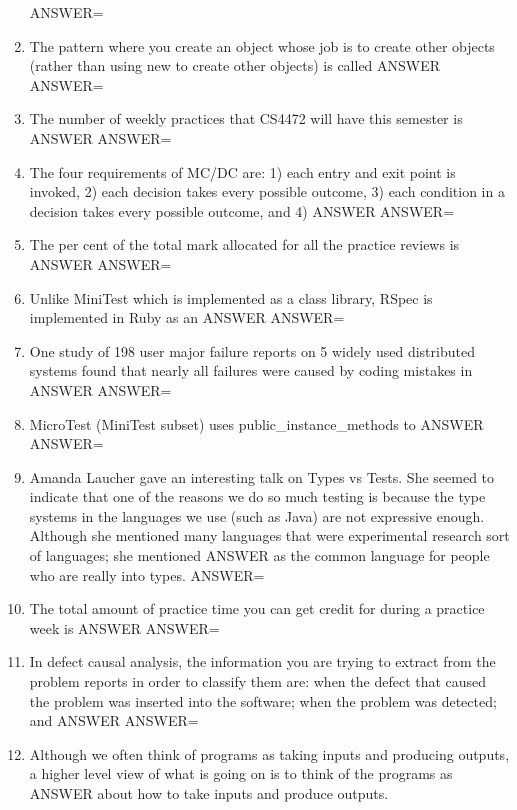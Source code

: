 \documentclass{exam}
\begin{document}
\begin{enumerate}
ANSWER=
\item The pattern where you create an object whose job is to create other objects (rather than using new to create other objects) is called ANSWER\newline
ANSWER=
\item The number of weekly practices that CS4472 will have this semester is ANSWER\newline
ANSWER=
\item The four requirements of MC/DC are: 1) each entry and exit point is invoked, 2) each decision takes every possible outcome, 3) each condition in a decision takes every possible outcome, and 4) ANSWER\newline
ANSWER=
\item The per cent of the total mark allocated for all the practice reviews is ANSWER\newline
ANSWER=
\item Unlike MiniTest which is implemented as a class library, RSpec is implemented in Ruby as an ANSWER\newline
ANSWER=
\item One study of 198 user major failure reports on 5 widely used distributed systems found that nearly all failures were caused by coding mistakes in ANSWER\newline
ANSWER=
\item MicroTest (MiniTest subset) uses public\_instance\_methods to ANSWER\newline
ANSWER=
\item Amanda Laucher gave an interesting talk on Types vs Tests.  She seemed to indicate that one of the reasons we do so much testing is because the type systems in the languages we use (such as Java) are not expressive enough.  Although she mentioned many languages that were experimental research sort of languages; she mentioned ANSWER as the common language for people who are really into types.\newline
ANSWER=
\item The total amount of practice time you can get credit for during a practice week is ANSWER\newline
ANSWER=
\item In defect causal analysis, the information you are trying to extract from the problem reports in order to classify them are: when the defect that caused the problem was inserted into the software; when the problem was detected; and ANSWER\newline
ANSWER=
\item Although we often think of programs as taking inputs and producing outputs, a higher level view of what is going on is to think of the programs as ANSWER about how to take inputs and produce outputs.\newline

\end{enumerate}
\end{document}
